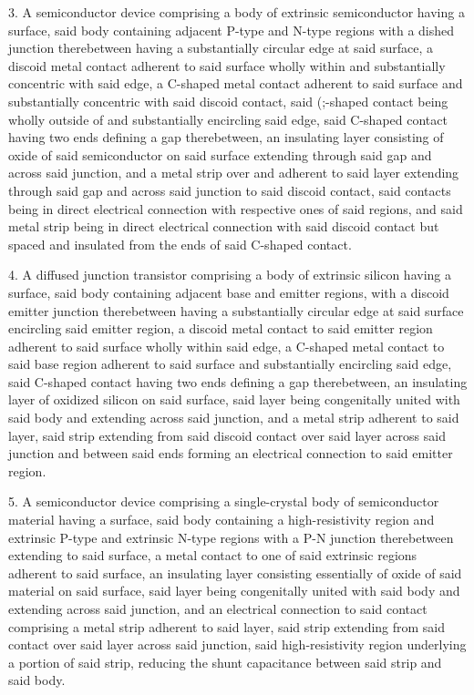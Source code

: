 3. A semiconductor device comprising a body of extrinsic semiconductor having a surface, said body containing adjacent P-type and N-type regions with a dished junction therebetween having a substantially circular edge at said surface, a discoid metal contact adherent to said surface wholly within and substantially concentric with said edge, a C-shaped metal contact adherent to said surface and substantially concentric with said discoid contact, said (;-shaped contact being wholly outside of and substantially encircling said edge, said C-shaped contact having two ends defining a gap therebetween, an insulating layer consisting of oxide of said semiconductor on said surface extending through said gap and across said junction, and a metal strip over and adherent to said layer extending through said gap and across said junction to said discoid contact, said contacts being in direct electrical connection with respective ones of said regions, and said metal strip being in direct electrical connection with said discoid contact but spaced and insulated from the ends of said C-shaped contact.

4. A diffused junction transistor comprising a body of extrinsic silicon having a surface, said body containing adjacent base and emitter regions, with a discoid emitter junction therebetween having a substantially circular edge at said surface encircling said emitter region, a discoid metal contact to said emitter region adherent to said surface wholly within said edge, a C-shaped metal contact to said base region adherent to said surface and substantially encircling said edge, said C-shaped contact having two ends defining a gap therebetween, an insulating layer of oxidized silicon on said surface, said layer being congenitally united with said body and extending across said junction, and a metal strip adherent to said layer, said strip extending from said discoid contact over said layer across said junction and between said ends forming an electrical connection to said emitter region.

5. A semiconductor device comprising a single-crystal body of semiconductor material having a surface, said body containing a high-resistivity region and extrinsic P-type and extrinsic N-type regions with a P-N junction therebetween extending to said surface, a metal contact to one of said extrinsic regions adherent to said surface, an insulating layer consisting essentially of oxide of said material on said surface, said layer being congenitally united with said body and extending across said junction, and an electrical connection to said contact comprising a metal strip adherent to said layer, said strip extending from said contact over said layer across said junction, said high-resistivity region underlying a portion of said strip, reducing the shunt capacitance between said strip and said body.

